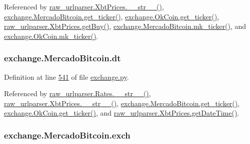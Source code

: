 Referenced by \hyperlink{raw__urlparser_8py_source_l00074}{raw\+\_\+urlparser.\+Xbt\+Prices.\+\_\+\+\_\+str\+\_\+\+\_\+()}, \hyperlink{exchange_8py_source_l00543}{exchange.\+Mercado\+Bitcoin.\+get\+\_\+ticker()}, \hyperlink{exchange_8py_source_l00608}{exchange.\+Ok\+Coin.\+get\+\_\+ticker()}, \hyperlink{raw__urlparser_8py_source_l00062}{raw\+\_\+urlparser.\+Xbt\+Prices.\+get\+Buy()}, \hyperlink{exchange_8py_source_l00557}{exchange.\+Mercado\+Bitcoin.\+mk\+\_\+ticker()}, and \hyperlink{exchange_8py_source_l00622}{exchange.\+Ok\+Coin.\+mk\+\_\+ticker()}.

\subsubsection[{\texorpdfstring{dt}{dt}}]{\setlength{\rightskip}{0pt plus 5cm}exchange.\+Mercado\+Bitcoin.\+dt}\hypertarget{classexchange_1_1_mercado_bitcoin_aeee983ba4f72223a11fb914d22902c56}{}\label{classexchange_1_1_mercado_bitcoin_aeee983ba4f72223a11fb914d22902c56}


Definition at line \hyperlink{exchange_8py_source_l00541}{541} of file \hyperlink{exchange_8py_source}{exchange.\+py}.



Referenced by \hyperlink{raw__urlparser_8py_source_l00038}{raw\+\_\+urlparser.\+Rates.\+\_\+\+\_\+str\+\_\+\+\_\+()}, \hyperlink{raw__urlparser_8py_source_l00074}{raw\+\_\+urlparser.\+Xbt\+Prices.\+\_\+\+\_\+str\+\_\+\+\_\+()}, \hyperlink{exchange_8py_source_l00543}{exchange.\+Mercado\+Bitcoin.\+get\+\_\+ticker()}, \hyperlink{exchange_8py_source_l00608}{exchange.\+Ok\+Coin.\+get\+\_\+ticker()}, and \hyperlink{raw__urlparser_8py_source_l00059}{raw\+\_\+urlparser.\+Xbt\+Prices.\+get\+Date\+Time()}.

\subsubsection[{\texorpdfstring{exch}{exch}}]{\setlength{\rightskip}{0pt plus 5cm}exchange.\+Mercado\+Bitcoin.\+exch}\hypertarget{classexchange_1_1_mercado_bitcoin_a68701550b43374441e52ea2082d88400}{}\label{classexchange_1_1_mercado_bitcoin_a68701550b43374441e52ea2082d88400}



